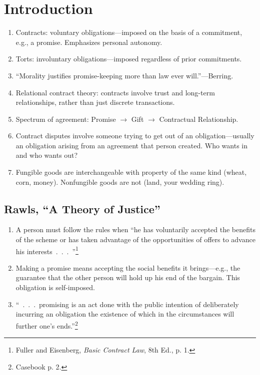 \section{Introduction}

\begin{enumerate}
    \item Contracts: voluntary obligations---imposed on the basis of a 
    commitment, e.g., a promise. Emphasizes personal autonomy.
    \item Torts: involuntary obligations---imposed regardless of prior 
    commitments.
    \item ``Morality justifies promise-keeping more than law ever 
    will.''---Berring.
    \item Relational contract theory: contracts involve trust and long-term 
    relationships, rather than just discrete transactions.
    \item Spectrum of agreement: Promise $\rightarrow$ Gift $\rightarrow$ 
    Contractual Relationship.
    \item Contract disputes involve someone trying to get out of an 
    obligation---usually an obligation arising from an agreement that person 
    created. Who wants in and who wants out?
    \item Fungible goods are interchangeable with property of the same kind 
    (wheat, corn, money). Nonfungible goods are not (land, your wedding ring).
\end{enumerate}

\subsection{Rawls, ``A Theory of Justice''}

\begin{enumerate}
    \item A person must follow the rules when ``he has voluntarily accepted 
    the benefits of the scheme or has taken advantage of the opportunities of 
    offers to advance his interests~.~.~.~''\footnote{Fuller and Eisenberg, 
    \emph{Basic Contract Law}, 8th Ed., p. 1.}
    \item Making a promise means accepting the social benefits it 
    brings---e.g., the guarantee that the other person will hold up his end of 
    the bargain. This obligation is self-imposed.
    \item ``~.~.~.~promising is an act done with the public intention of 
    deliberately incurring an obligation the existence of which in the 
    circumstances will further one's ends.''\footnote{Casebook p. 2.}
\end{enumerate}

